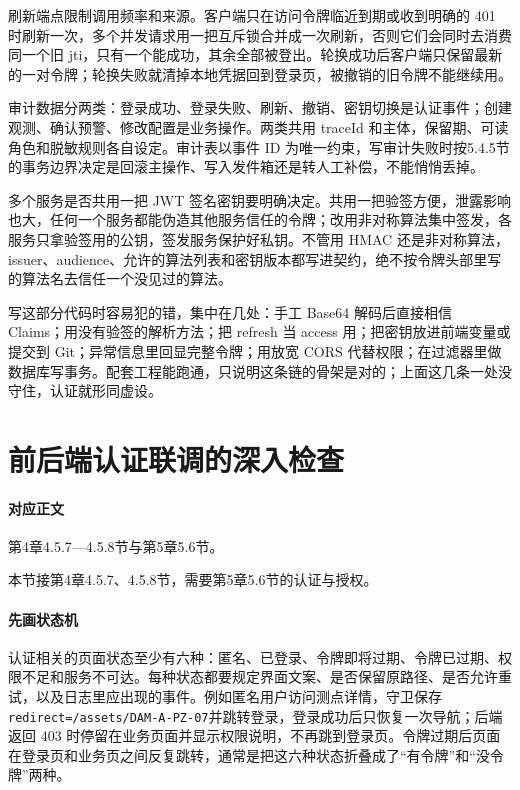 刷新端点限制调用频率和来源。客户端只在访问令牌临近到期或收到明确的 401 时刷新一次，多个并发请求用一把互斥锁合并成一次刷新，否则它们会同时去消费同一个旧 jti，只有一个能成功，其余全部被登出。轮换成功后客户端只保留最新的一对令牌；轮换失败就清掉本地凭据回到登录页，被撤销的旧令牌不能继续用。

审计数据分两类：登录成功、登录失败、刷新、撤销、密钥切换是认证事件；创建观测、确认预警、修改配置是业务操作。两类共用 traceId 和主体，保留期、可读角色和脱敏规则各自设定。审计表以事件 ID 为唯一约束，写审计失败时按5.4.5节的事务边界决定是回滚主操作、写入发件箱还是转人工补偿，不能悄悄丢掉。

多个服务是否共用一把 JWT 签名密钥要明确决定。共用一把验签方便，泄露影响也大，任何一个服务都能伪造其他服务信任的令牌；改用非对称算法集中签发，各服务只拿验签用的公钥，签发服务保护好私钥。不管用 HMAC 还是非对称算法，issuer、audience、允许的算法列表和密钥版本都写进契约，绝不按令牌头部里写的算法名去信任一个没见过的算法。

写这部分代码时容易犯的错，集中在几处：手工 Base64 解码后直接相信 Claims；用没有验签的解析方法；把 refresh 当 access 用；把密钥放进前端变量或提交到 Git；异常信息里回显完整令牌；用放宽 CORS 代替权限；在过滤器里做数据库写事务。配套工程能跑通，只说明这条链的骨架是对的；上面这几条一处没守住，认证就形同虚设。

\section{前后端认证联调的深入检查}\label{app:ext-fe-auth}\label{online:frontend-auth}

\paragraph{对应正文}第4章4.5.7—4.5.8节与第5章5.6节。

本节接第4章4.5.7、4.5.8节，需要第5章5.6节的认证与授权。

\paragraph{先画状态机}认证相关的页面状态至少有六种：匿名、已登录、令牌即将过期、令牌已过期、权限不足和服务不可达。每种状态都要规定界面文案、是否保留原路径、是否允许重试，以及日志里应出现的事件。例如匿名用户访问测点详情，守卫保存\texttt{redirect=/assets/DAM-A-PZ-07}并跳转登录，登录成功后只恢复一次导航；后端返回 403 时停留在业务页面并显示权限说明，不再跳到登录页。令牌过期后页面在登录页和业务页之间反复跳转，通常是把这六种状态折叠成了“有令牌”和“没令牌”两种。

